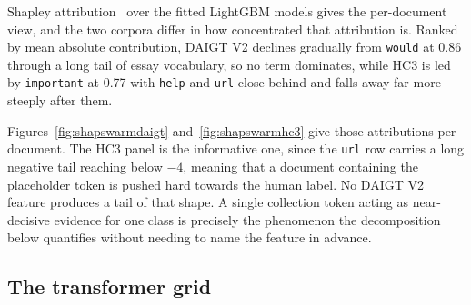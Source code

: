 \documentclass[conference,a4paper]{IEEEtran}
\begin{document}
Shapley attribution~\cite{Lundberg2017unified} over the fitted LightGBM models gives the per-document view, and the two corpora differ in how concentrated that attribution is. Ranked by mean absolute contribution, DAIGT V2 declines gradually from \texttt{would} at 0.86 through a long tail of essay vocabulary, so no term dominates, while HC3 is led by \texttt{important} at 0.77 with \texttt{help} and \texttt{url} close behind and falls away far more steeply after them.

Figures~\ref{fig:shapswarmdaigt} and~\ref{fig:shapswarmhc3} give those attributions per document. The HC3 panel is the informative one, since the \texttt{url} row carries a long negative tail reaching below $-4$, meaning that a document containing the placeholder token is pushed hard towards the human label. No DAIGT V2 feature produces a tail of that shape. A single collection token acting as near-decisive evidence for one class is precisely the phenomenon the decomposition below quantifies without needing to name the feature in advance.

\subsection{The transformer grid}
\end{document}

